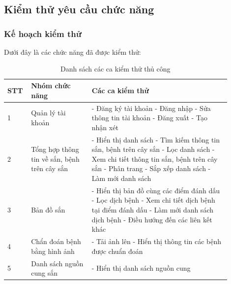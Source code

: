 \documentclass[./../main.tex]{subfiles}
\begin{document}
\subsection{Kiểm thử yêu cầu chức năng}
\subsubsection{Kế hoạch kiểm thử}
Dưới đây là các chức năng đã được kiểm thử:
\begin{longtable}{| p{0.07\linewidth} | p{0.25\linewidth} | p{0.58\linewidth} |}
\caption{Danh sách các ca kiểm thử thủ công} \label{test-case-list}
\hline
\textbf{STT} & \textbf{Nhóm chức năng} & \textbf{Các ca kiểm thử} \\ \hline 
    \centerline{1} & 
    Quản lý tài khoản & 
    - Đăng ký tài khoản \newline
    - Đăng nhập \newline
    - Sửa thông tin tài khoản \newline
    - Đăng xuất \newline
    - Tạo nhận xét
\\ \hline
    \centerline{2} & 
    Tổng hợp thông tin về sắn, bệnh trên cây sắn &
    - Hiển thị danh sách \newline
    - Tìm kiếm thông tin sắn, bệnh trên cây sắn \newline
    - Lọc danh sách \newline
    - Xem chi tiết thông tin sắn, bệnh trên cây sắn  \newline 
    - Phân trang \newline 
    - Sắp xếp danh sách \newline
    - Làm mới danh sách
\\ \hline
    \centerline{3} & 
    Bản đồ sắn & 
    - Hiển thị bản đồ cùng các điểm đánh dấu \newline
    - Lọc dịch bệnh \newline
    - Xem chi tiết dịch bệnh tại điểm đánh dấu \newline 
    - Làm mới danh sách dịch bệnh \newline 
    - Điều hướng đến các liên kết khác
\\ \hline
    \centerline{4} & 
    Chẩn đoán bệnh bằng hình ảnh &
    - Tải ảnh lên \newline
    - Hiển thị thông tin các bệnh được chuẩn đoán 
\\ \hline
    \centerline{5} & 
    Danh sách nguồn cung sắn &
    - Hiển thị danh sách nguồn cung \newline

\end{longtable}
\end{document}
